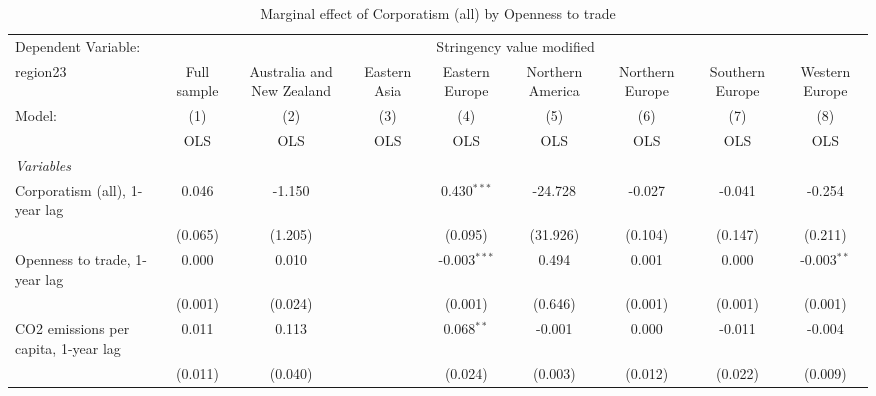 
\begin{table}[htbp]
   \caption{Marginal effect of Corporatism (all) by Openness to trade}
   \centering
   \begin{tabular}{lcccccccc}
      \toprule
      Dependent Variable: & \multicolumn{8}{c}{Stringency value modified}\\
      region23                                                      & Full sample   & Australia and New Zealand & Eastern Asia & Eastern Europe & Northern America & Northern Europe & Southern Europe & Western Europe \\   
      Model:                                                        & (1)           & (2)                       & (3)          & (4)            & (5)              & (6)             & (7)             & (8)\\  
                                                                    &  OLS          & OLS                       & OLS          & OLS            & OLS              & OLS             & OLS             & OLS\\  
      \midrule
      \emph{Variables}\\
      Corporatism (all), 1-year lag                                 & 0.046         & -1.150                    &              & 0.430$^{***}$  & -24.728          & -0.027          & -0.041          & -0.254\\   
                                                                    & (0.065)       & (1.205)                   &              & (0.095)        & (31.926)         & (0.104)         & (0.147)         & (0.211)\\   
      Openness to trade, 1-year lag                                 & 0.000         & 0.010                     &              & -0.003$^{***}$ & 0.494            & 0.001           & 0.000           & -0.003$^{**}$\\   
                                                                    & (0.001)       & (0.024)                   &              & (0.001)        & (0.646)          & (0.001)         & (0.001)         & (0.001)\\   
      CO2 emissions per capita, 1-year lag                          & 0.011         & 0.113                     &              & 0.068$^{**}$   & -0.001           & 0.000           & -0.011          & -0.004\\   
                                                                    & (0.011)       & (0.040)                   &              & (0.024)        & (0.003)          & (0.012)         & (0.022)         & (0.009)\\   

\end{tabular}
\end{table}
